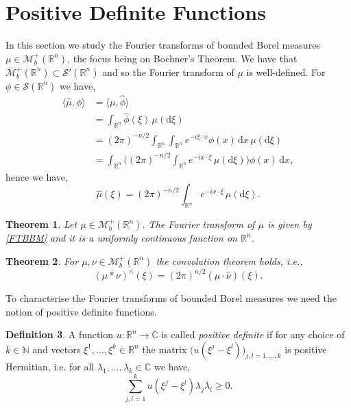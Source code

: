\documentclass[a4paper, 12pt]{report}
\newtheorem{theorem}{Theorem}[section]
\theoremstyle{remark}
\theoremstyle{definition}
\newtheorem{definition}[theorem]{Definition}
\begin{document}
\section{Positive Definite Functions}\label{Se.PDF}

In this section we study the Fourier transforms of bounded Borel measures $\mu \in \mathcal{M}_b^+(\mathbb{R}^n)$, the focus being on Bochner's Theorem.  We have that $\mathcal{M}_b^+(\mathbb{R}^n) \subset \mathcal{S}'(\mathbb{R}^n)$ and so the Fourier transform of $\mu$ is well-defined.  For $\phi \in \mathcal{S}(\mathbb{R}^n)$ we have,
$$
\begin{aligned}
\langle\hat{\mu}, \phi\rangle & = \langle\mu, \hat{\phi}\rangle\\
& = \int_{\mathbb{R}^n}\hat{\phi}(\xi)\,\mu(\mathrm{d}\xi)\\
& = (2\pi)^{-n/2}\int_{\mathbb{R}^n}\int_{\mathbb{R}^n}e^{-i\xi\cdot x}\phi(x)\,\mathrm{d}x\,\mu(\mathrm{d}\xi)\\
& = \int_{\mathbb{R}^n}\bigg((2\pi)^{-n/2}\int_{\mathbb{R}^n}e^{-ix\cdot\xi}\,\mu(\mathrm{d}\xi)\bigg)\phi(x)\,\mathrm{d}x,
\end{aligned}
$$
hence we have,
\begin{equation}
\hat{\mu}(\xi) = (2\pi)^{-n/2}\int_{\mathbb{R}^n}e^{-ix\cdot\xi}\,\mu(\mathrm{d}\xi).\label{FTBBM}
\end{equation}

\begin{theorem}
Let $\mu \in \mathcal{M}_b^+(\mathbb{R}^n)$.  The Fourier transform of $\mu$ is given by \eqref{FTBBM} and it is a uniformly continuous function on $\mathbb{R}^n$.
\end{theorem}

\begin{theorem}
For $\mu, \nu \in \mathcal{M}_b^+(\mathbb{R}^n)$ the convolution theorem holds, i.e.,
\begin{equation}
(\mu\ast\nu)^\wedge(\xi) = (2\pi)^{n/2}(\hat{\mu}\cdot\hat{\nu})(\xi).
\end{equation}
\end{theorem}

To characterise the Fourier transforms of bounded Borel measures we need the notion of positive definite functions.
\begin{definition}
A function $u : \mathbb{R}^n \to \mathbb{C}$ is called \emph{positive definite} if for any choice of $k \in \mathbb{N}$ and vectors $\xi^1, \dots, \xi^k \in \mathbb{R}^n$ the matrix $\big(u(\xi^j - \xi^l)\big)_{j, l = 1, \dots, k}$ is positive Hermitian, i.e. for all $\lambda_1, \dots, \lambda_k \in \mathbb{C}$ we have,
\begin{equation}
\sum_{j, l = 1}^ku(\xi^j - \xi^l)\lambda_j\bar{\lambda}_l \ge 0.
\end{equation}
\end{definition}
\end{document}
